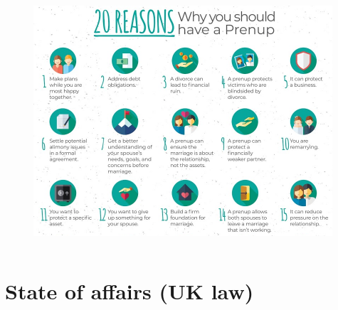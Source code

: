 \documentclass[xcolor=dvipsnames]{beamer}
\begin{document}
\begin{frame}[plain]
  \begin{columns}[T] %
    \begin{column}{0.9\textwidth}
      \begin{figure}[H]
        \centering
        \includegraphics[width=0.99\textwidth]{prenup}
      \end{figure}
    \end{column}%
  \end{columns}
\end{frame}


\section{State of affairs (UK law)}
\end{document}
